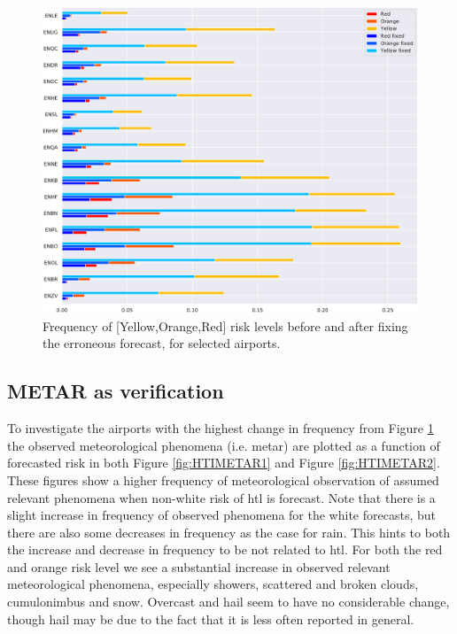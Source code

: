 \begin{figure}
    \centering
    \includegraphics[width=\textwidth]{Figures/fixeffect.pdf}
    \caption{Frequency of [Yellow,Orange,Red] risk levels before and after fixing the erroneous forecast, for selected airports.}
    \label{fig:fixeffect}
\end{figure}

\subsection{METAR as verification}
To investigate the airports with the highest change in frequency from Figure \ref{fig:fixeffect} the observed meteorological phenomena (i.e. \acrshort{metar}) are plotted as a function of forecasted risk in both Figure \ref{fig:HTIMETAR1} and Figure \ref{fig:HTIMETAR2}. These figures show a higher frequency of meteorological observation of assumed relevant phenomena when non-white risk of \acrshort{htl} is forecast. Note that there is a slight increase in frequency of observed phenomena for the white forecasts, but there are also some decreases in frequency as the case for rain. This hints to both the increase and decrease in frequency to be not related to \acrshort{htl}. For both the red and orange risk level we see a substantial increase in observed relevant meteorological phenomena, especially showers, scattered and broken clouds, cumulonimbus and snow. Overcast and hail seem to have no considerable change, though hail may be due to the fact that it is less often reported in general.

